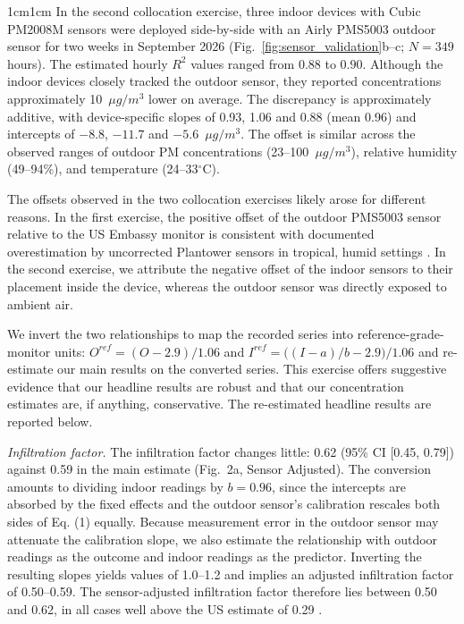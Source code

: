 \documentclass[9pt,twoside]{pnas-new}
\begin{document}
\begin{adjustwidth}{1cm}{1cm}
In the second collocation exercise, three indoor devices with Cubic PM2008M sensors were deployed side-by-side with an Airly PMS5003 outdoor sensor for two weeks in September 2026 (Fig.~\ref{fig:sensor_validation}b--c; $N = 349$ hours). The estimated hourly $R^2$ values ranged from $0.88$ to $0.90$. Although the indoor devices closely tracked the outdoor sensor, they reported concentrations approximately 10~$\mu g/m^3$ lower on average.
The discrepancy is approximately additive, with device-specific slopes of 0.93, 1.06 and 0.88 (mean 0.96) and intercepts of $-8.8$, $-11.7$ and $-5.6$~$\mu g/m^3$. The offset is similar across the observed ranges of outdoor PM concentrations (23--100~$\mu g/m^3$), relative humidity (49--94\%), and temperature (24--33$^\circ$C).

The offsets observed in the two collocation exercises likely arose for different reasons. In the first exercise, the positive offset of the outdoor PMS5003 sensor relative to the US Embassy monitor is consistent with documented overestimation by uncorrected Plantower sensors in tropical, humid settings \citep{hossain_performance_2025, Wulandari2024}. In the second exercise, we attribute the negative offset of the indoor sensors to their placement inside the device, whereas the outdoor sensor was directly exposed to ambient air.

We invert the two relationships to map the recorded series into reference-grade-monitor units: $O^{ref} = (O - 2.9)/1.06$ and $I^{ref} = \big((I - a)/b - 2.9\big)/1.06$ and re-estimate our main results on the converted series. This exercise offers suggestive evidence that our headline results are robust and that our concentration estimates are, if anything, conservative. The re-estimated headline results are reported below.

\vspace{.3cm}
\textit{Infiltration factor.} The infiltration factor changes little: 0.62 (95\% CI [0.45, 0.79]) against 0.59 in the main estimate (Fig.~2a, Sensor Adjusted). The conversion amounts to dividing indoor readings by $b = 0.96$, since the intercepts are absorbed by the fixed effects and the outdoor sensor's calibration rescales both sides of Eq. (1) equally. Because measurement error in the outdoor sensor may attenuate the calibration slope, we also estimate the relationship with outdoor readings as the outcome and indoor readings as the predictor. Inverting the resulting slopes yields values of 1.0--1.2 and implies an adjusted infiltration factor of 0.50--0.59. The sensor-adjusted infiltration factor therefore lies between 0.50 and 0.62, in all cases well above the US estimate of 0.29 \citep{lunderberg_assessing_2023}.


\end{adjustwidth}
\end{document}
